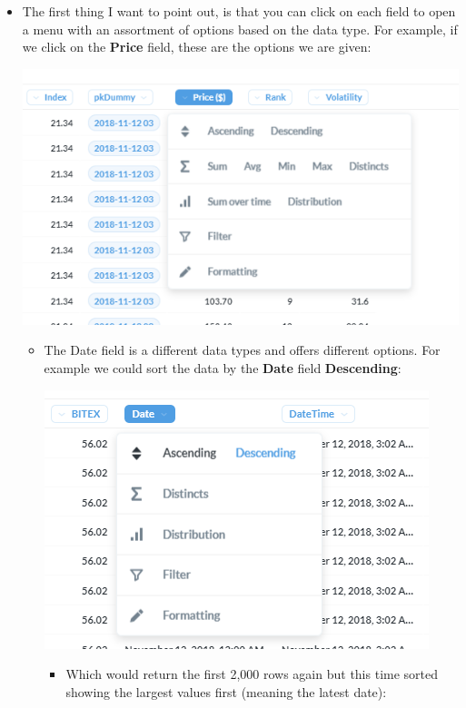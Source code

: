 \documentclass[]{book}
\begin{document}
\begin{itemize}
\item
  The first thing I want to point out, is that you can click on each field to open a menu with an assortment of options based on the data type. For example, if we click on the \textbf{Price} field, these are the options we are given:

  \includegraphics{images/PriceFieldOptions.png}

  \begin{itemize}
  \item
    The Date field is a different data types and offers different options. For example we could sort the data by the \textbf{Date} field \textbf{Descending}:

    \includegraphics{images/DateDescendingOption.png}

    \begin{itemize}
    \item
      Which would return the first 2,000 rows again but this time sorted showing the largest values first (meaning the latest date):


\end{itemize}
\end{itemize}
\end{itemize}
\end{document}
